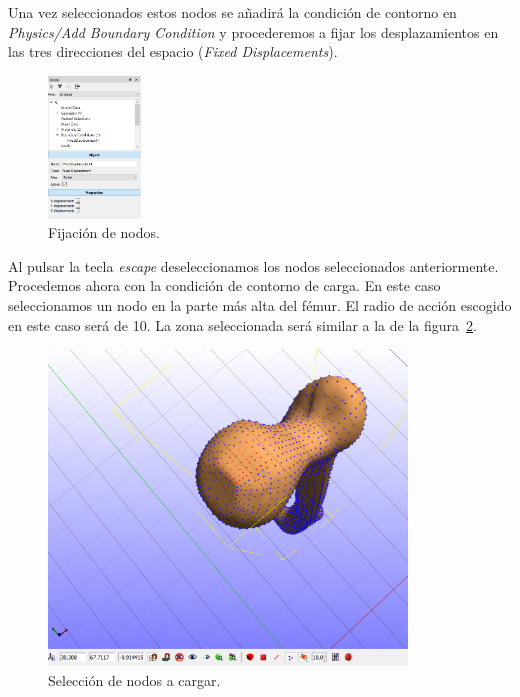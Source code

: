  Una vez seleccionados estos nodos se añadirá la condición de contorno en \textit{Physics/Add Boundary Condition} y procederemos a fijar los desplazamientos en las tres direcciones del espacio (\textit{Fixed Displacements}). 
 
 \begin{figure}[!htp]
\centering
\includegraphics[width=0.22\textwidth]{figuras_2/femur2b.png}
\caption{Fijación de nodos.}
\label{fig:femur2b}
\end{figure}
 
 Al pulsar la tecla \emph{escape} deseleccionamos los nodos seleccionados anteriormente. Procedemos ahora con la condición de contorno de carga. En este caso seleccionamos un nodo en la parte más alta del fémur. El radio de acción escogido en este caso será de 10. La zona seleccionada será similar a la de la figura~\ref{fig:femur3}.
  
  \begin{figure}[!htp]
\centering
\includegraphics[width=0.85\textwidth]{figuras_2/femur3.png}
\caption{Selección de nodos a cargar.}
\label{fig:femur3}
\end{figure}

